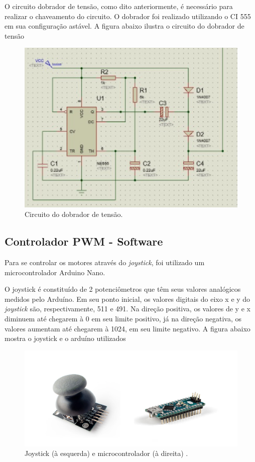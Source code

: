 O circuito dobrador de tensão, como dito anteriormente, é necessário para
realizar o chaveamento do circuito. O dobrador foi realizado utilizando o CI
555 em sua configuração astável. A figura abaixo ilustra o circuito do dobrador de tensão

\begin{figure}[h!]
  \centering
  \includegraphics[width=1.0\textwidth]{figuras/Dobrador.jpg}
  \caption{Circuito do dobrador de tensão.}
\end{figure}

\subsection{Controlador PWM - Software}

Para se controlar os motores através do \textit{joystick}, foi utilizado um
microcontrolador Arduino Nano. 

O joystick é constituído de 2 potenciômetros que têm seus valores analógicos
medidos pelo Arduíno. Em seu ponto inicial, os valores digitais do eixo x e y
do \textit{joystick} são, respectivamente, 511 e 491. Na direção positiva, os valores de
y e x diminuem até chegarem à 0 em seu limite positivo, já na direção negativa,
os valores aumentam até chegarem à 1024, em seu limite negativo. A figura
abaixo mostra o joystick e o arduíno utilizados

\begin{figure}[h!]
  \centering
  \includegraphics[width=1.0\textwidth]{figuras/controlador.jpg}
  \caption{Joystick (à esquerda) e microcontrolador (à direita) .}
\end{figure}

